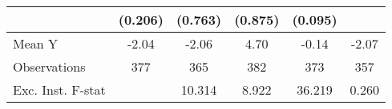 {\begin{tabular}{l*{5}{c}}
            &     (0.206)         &     (0.763)         &     (0.875)         &     (0.095)         &                     \\
\midrule
Mean Y      &       -2.04         &       -2.06         &        4.70         &       -0.14         &       -2.07         \\
Observations&         377         &         365         &         382         &         373         &         357         \\
Exc. Inst. F-stat&                     &      10.314         &       8.922         &      36.219         &       0.260         \\
\bottomrule
\end{tabular}
}
